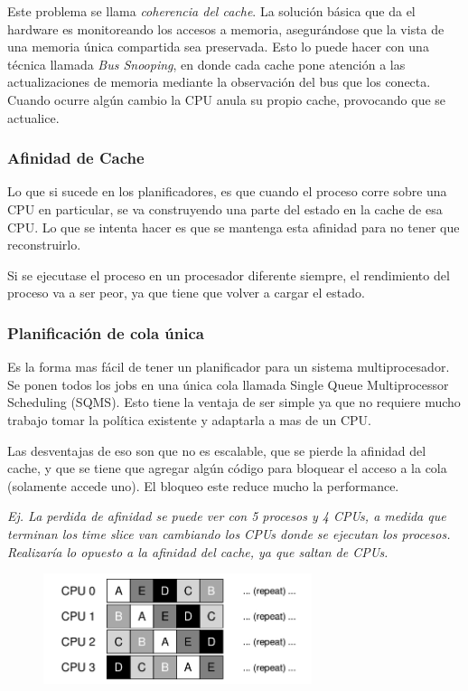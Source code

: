 \documentclass[titlepage,a4paper]{article}
\begin{document}
Este problema se llama \emph{coherencia del cache}. La solución básica que da el hardware es monitoreando los accesos a memoria, asegurándose que la vista de una memoria única compartida sea preservada. Esto lo puede hacer con una técnica llamada \emph{Bus Snooping}, en donde cada cache pone atención a las actualizaciones de memoria mediante la observación del bus que los conecta. Cuando ocurre algún cambio la CPU anula su propio cache, provocando que se actualice.

\subsubsection*{Afinidad de Cache}
Lo que si sucede en los planificadores, es que cuando el proceso corre sobre una CPU en particular, se va construyendo una parte del estado en la cache de esa CPU. Lo que se intenta hacer es que se mantenga esta afinidad para no tener que reconstruirlo.

Si se ejecutase el proceso en un procesador diferente siempre, el rendimiento del proceso va a ser peor, ya que tiene que volver a cargar el estado.

\subsubsection*{Planificación de cola única}
Es la forma mas fácil de tener un planificador para un sistema multiprocesador. Se ponen todos los jobs en una única cola llamada Single Queue Multiprocessor Scheduling (SQMS). Esto tiene la ventaja de ser simple ya que no requiere mucho trabajo tomar la política existente y adaptarla a mas de un CPU.

Las desventajas de eso son que no es escalable, que se pierde la afinidad del cache, y que se tiene que agregar algún código para bloquear el acceso a la cola (solamente accede uno). El bloqueo este reduce mucho la performance.

\textit{Ej. La perdida de afinidad se puede ver con 5 procesos y 4 CPUs, a medida que terminan los time slice van cambiando los CPUs donde se ejecutan los procesos. Realizaría lo opuesto a la afinidad del cache, ya que saltan de CPUs.}

\begin{figure}[!htb]
    \centering
    \includegraphics[width=0.7\textwidth]{ImagenesApunte/perdida_afinidad.jpg}
\end{figure}
\end{document}
